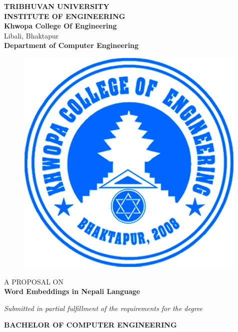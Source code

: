     \begin{center}
		\thispagestyle{empty}
		\Large\textbf{TRIBHUVAN UNIVERSITY}\\
		\Large\textbf{INSTITUTE OF ENGINEERING }\\
		\vspace{0.2in}
		\large{\textbf{Khwopa College Of Engineering}\\}
		\normalsize{Libali, Bhaktapur\\}
		\large\textbf{Department of Computer Engineering}
		\vspace{0.2in}
		\begin{figure}[h]
		    \centering
			    \includegraphics{img/Khwopalogo.jpg}
		\end{figure}
		
		\vspace{0.2in}
		\large{A PROPOSAL ON\\\textbf{Word Embeddings in Nepali Language}\\}
		
		\vspace{0.2in}
		\large{\textit{Submitted in partial fulfillment of the requirements for the degree\\}}
		
		\vspace{0.2in}
		\large{\textbf{BACHELOR OF COMPUTER ENGINEERING}\\}
		

\end{center}
